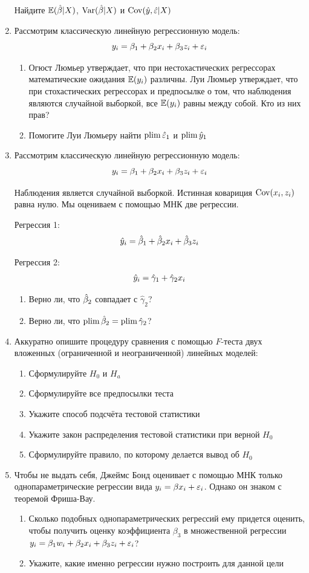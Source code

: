 \documentclass[12pt, a4paper]{article}\usepackage[]{graphicx}\usepackage[]{color}
\begin{document}
\begin{enumerate}
Найдите $\mathbb{E}(\hat{\beta}|X)$, $\operatorname{Var}(\hat{\beta}|X)$ и $\operatorname{Cov}(\hat{y}, \hat{\varepsilon} | X)$

\item Рассмотрим классическую линейную регрессионную модель:
\[
y_i = \beta_1 + \beta_2 x_i + \beta_3 z_i + \varepsilon_i
\]

\begin{enumerate}
\item Огюст Люмьер утверждает, что при нестохастических регрессорах математические ожидания $\mathbb{E}(y_i)$ различны. Луи Люмьер утверждает, что при стохастических регрессорах и предпосылке о том, что наблюдения являются случайной выборкой, все $\mathbb{E}(y_i)$ равны между собой. Кто из них прав?
\item Помогите Луи Люмьеру найти $\operatorname*{plim} \hat{\varepsilon}_1$ и $\operatorname*{plim} \hat{y}_1$
\end{enumerate}


\item Рассмотрим классическую линейную регрессионную модель:
\[
y_i = \beta_1 + \beta_2 x_i + \beta_3 z_i + \varepsilon_i
\]

Наблюдения является случайной выборкой. Истинная ковариция $\operatorname{Cov}(x_i, z_i)$ равна нулю. Мы оцениваем с помощью МНК две регрессии.

Регрессия 1:
\[
\hat{y}_i = \hat{\beta}_1 + \hat{\beta}_2 x_i + \hat{\beta}_3 z_i
\]

Регрессия 2:
\[
\hat{y}_i = \hat \gamma_1 + \hat \gamma_2 x_i
\]

\begin{enumerate}
\item Верно ли, что $\hat{\beta}_2$ совпадает с $\hat \gamma_2$?
\item Верно ли, что $\operatorname*{plim} \hat{\beta}_2 = \operatorname*{plim} \hat \gamma_2$?
\end{enumerate}


\item Аккуратно опишите процедуру сравнения с помощью $F$-теста двух вложенных (ограниченной и неограниченной) линейных моделей:
\begin{enumerate}
\item Сформулируйте $H_0$ и $H_a$
\item Сформулируйте все предпосылки теста
\item Укажите способ подсчёта тестовой статистики
\item Укажите закон распределения тестовой статистики при верной $H_0$
\item Сформулируйте правило, по которому делается вывод об $H_0$
\end{enumerate}

\item Чтобы не выдать себя, Джеймс Бонд оценивает с помощью МНК только однопараметрические регрессии вида $y_i=\beta x_i + \varepsilon_i$. Однако он знаком с теоремой Фриша-Вау.
\begin{enumerate}
\item Сколько подобных однопараметрических регрессий ему придется оценить, чтобы получить оценку коэффициента $\beta_3$ в множественной регрессии $y_i = \beta_1 w_i + \beta_2 x_i + \beta_3 z_i + \varepsilon_i$?
\item Укажите, какие именно регрессии нужно построить для данной цели
\end{enumerate}

\end{enumerate}
\end{document}
